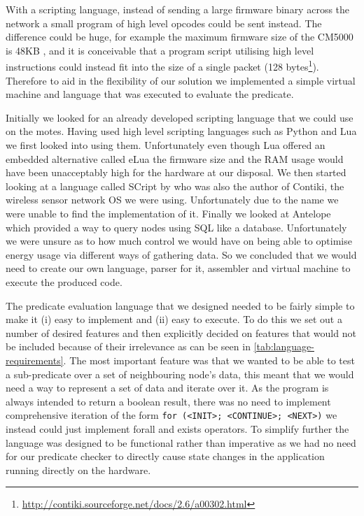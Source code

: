 With a scripting language, instead of sending a large firmware binary across the network a small program of high level opcodes could be sent instead. The difference could be huge, for example the maximum firmware size of the CM5000 is 48KB \cite{CM5000}, and it is conceivable that a program script utilising high level instructions could instead fit into the size of a single packet (128 bytes\footnote{\url{http://contiki.sourceforge.net/docs/2.6/a00302.html}}). Therefore to aid in the flexibility of our solution we implemented a simple virtual machine and language that was executed to evaluate the predicate.


Initially we looked for an already developed scripting language that we could use on the motes. Having used high level scripting languages such as Python and Lua we first looked into using them. Unfortunately even though Lua offered an embedded alternative called eLua \cite{elua} the firmware size and the RAM usage would have been unacceptably high for the hardware at our disposal. We then started looking at a language called SCript  \cite{dunkels06lowoverhead} by  \citeauthor{dunkels06lowoverhead} who was also the author of Contiki, the wireless sensor network OS we were using. Unfortunately due to the name we were unable to find the implementation of it. Finally we looked at Antelope \cite{Tsiftes:2011:DS:2070942.2070974} which provided a way to query nodes using SQL like a database. Unfortunately we were unsure as to how much control we would have on being able to optimise energy usage via different ways of gathering data. So we concluded that we would need to create our own language, parser for it, assembler and virtual machine to execute the produced code.


The predicate evaluation language that we designed needed to be fairly simple to make it (i) easy to implement and (ii) easy to execute. To do this we set out a number of desired features and then explicitly decided on features that would not be included because of their irrelevance as can be seen in \autoref{tab:language-requirements}. The most important feature was that we wanted to be able to test a sub-predicate over a set of neighbouring node's data, this meant that we would need a way to represent a set of data and iterate over it. As the program is always intended to return a boolean result, there was no need to implement comprehensive iteration of the form \verb|for (<INIT>; <CONTINUE>; <NEXT>)| we instead could just implement forall and exists operators. To simplify further the language was designed to be functional rather than imperative as we had no need for our predicate checker to directly cause state changes in the application running directly on the hardware.

